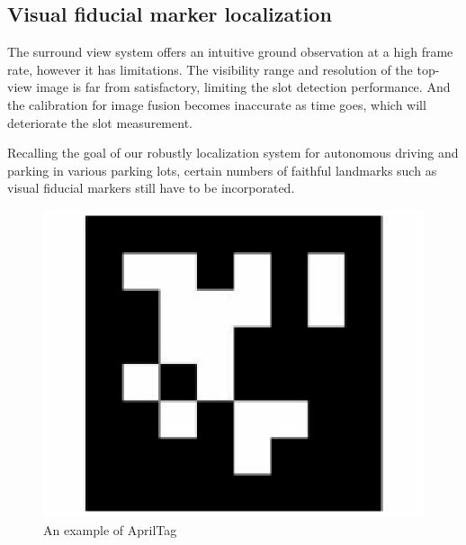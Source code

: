 \documentclass[journal]{IEEEtran}
\begin{document}




\subsection{Visual fiducial marker localization}

The surround view system offers an intuitive ground observation at a high frame rate, however it has limitations. 
The visibility range and resolution of the top-view image is far from satisfactory, limiting the slot detection performance. 
And the calibration for image fusion becomes inaccurate as time goes, which will deteriorate the slot measurement.

Recalling the goal of our robustly localization system for autonomous driving and parking in various parking lots, certain numbers of faithful landmarks such as visual fiducial markers still have to be incorporated.

\begin{figure}
\centering
\includegraphics{pic/fig6_Visual_markers}
\caption{An example of AprilTag}\label{fig:6}
\end{figure}
\end{document}
